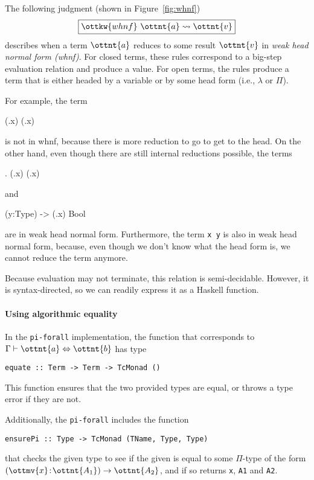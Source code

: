 \documentclass{article}
\newcommand\pif{\texttt{pi-forall}\xspace}
\theoremstyle{definition}
\begin{document}
The following judgment (shown in Figure~\ref{fig:whnf})
%
\[ \fbox{$ \ottkw{whnf} \  \ottnt{a}  \leadsto  \ottnt{v} $} \]
%
describes when a term $\ottnt{a}$ reduces to some result $\ottnt{v}$ in \emph{weak head normal form (whnf)}.
For closed terms, these rules correspond to a big-step evaluation relation and produce
a value. For open terms, the rules produce a term that is either headed by a variable
or by some head form (i.e., $\lambda$ or $\Pi$).

For example, the term
\begin{piforall}
 (\x.x) (\x.x)
\end{piforall}
is not in whnf, because there is more reduction to go to get to the head. On
the other hand, even though there are still internal reductions possible, the terms
\begin{piforall}
  \y. (\x.x) (\x.x)
\end{piforall}
and
\begin{piforall}
 (y:Type) -> (\x.x) Bool
\end{piforall}
are in weak head normal form. Furthermore, the term \texttt{x\ y} is also in
weak head normal form, because, even though we don't know what the head form
is, we cannot reduce the term anymore.

Because evaluation may not terminate, this relation is
semi-decidable. However, it is syntax-directed, so we can readily express it as
a Haskell function.

\paragraph{Using algorithmic equality}

In the \pif implementation, the function that corresponds to $\Gamma  \vdash  \ottnt{a}  \Leftrightarrow  \ottnt{b}$
has type
%
\begin{verbatim}
equate :: Term -> Term -> TcMonad ()
\end{verbatim}
%
This function ensures that the two provided types are equal, or throws a type error if
they are not.

Additionally, the \pif includes the function
\begin{verbatim}
ensurePi :: Type -> TcMonad (TName, Type, Type)
\end{verbatim}
that checks the given type to see if the given is equal to some $\Pi$-type of the form
$ ( \ottmv{x} \!:\! \ottnt{A_{{\mathrm{1}}}} )  \to   \ottnt{A_{{\mathrm{2}}}} $, and if so returns \texttt{x},
\texttt{A1} and \texttt{A2}.
\end{document}
